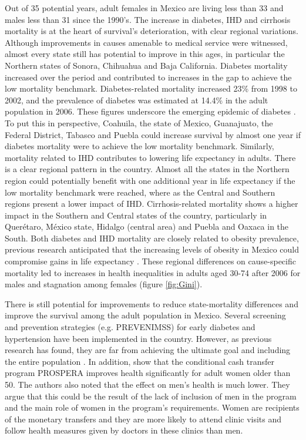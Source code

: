 \documentclass[11.5pt]{article}
\begin{document}
\begin{spacing}{1.5}
Out of 35 potential years, adult females in Mexico are living less than 33 and males less than 31 since the 1990's. The increase in  diabetes, IHD and cirrhosis mortality is at the heart of survival's deterioration, with clear regional variations. Although improvements in causes amenable to medical service were witnessed, almost every state still has potential to improve in this ages, in particular the Northern states of Sonora, Chihuahua and Baja California. Diabetes mortality increased over the period and contributed to increases in the gap to achieve the low mortality benchmark. Diabetes-related mortality increased 23\% from 1998 to 2002, and the prevalence of diabetes was estimated at 14.4\% in the adult population in 2006. These figures underscore the emerging epidemic of diabetes \citep{glassman2010confronting}. To put this in perspective, Coahuila, the state of Mexico, Guanajuato, the Federal District, Tabasco and Puebla could increase survival by almost one year if diabetes mortality were to achieve the low mortality benchmark. Similarly, mortality related to IHD contributes to lowering life expectancy in adults. There is a clear regional pattern in the country. Almost all the states in the Northern region could potentially benefit with one additional year in life expectancy if the low mortality benchmark were reached, where as the Central and Southern regions present a lower impact of IHD. Cirrhosis-related mortality shows a higher impact in the Southern and Central states of the country, particularly in Quer\'etaro, M\'exico state, Hidalgo (central area) and Puebla and Oaxaca in the South. Both diabetes and IHD mortality are closely related to obesity prevalence, previous research anticipated that the increasing levels of obesity in Mexico could compromise gains in life expectancy \citep{monteverde2010obesity}. These regional differences on cause-specific mortality led to increases in health inequalities in adults aged 30-74 after 2006 for males and stagnation among females (figure \ref{fig:Gini}). 


There is still potential for improvements to reduce state-mortality differences and improve the survival among the adult population in Mexico. Several screening and prevention strategies (e.g. PREVENIMSS) for early diabetes and hypertension have been implemented in the country. However, as previous research has found, they are far from achieving the ultimate goal and including the entire population \citep{castro2010potential}. In addition, \citet{behrman2013health} show that the conditional cash transfer program PROSPERA improves health significantly for adult women older than 50. The authors also noted that the effect on men's health is much lower. They argue that this could be the result of the lack of inclusion of men in the program and the main role of women in the program's requirements. Women are recipients of the monetary transfers and they are more likely to attend clinic visits and follow health measures given by doctors in these clinics than men.\\


\end{spacing}
\end{document}
